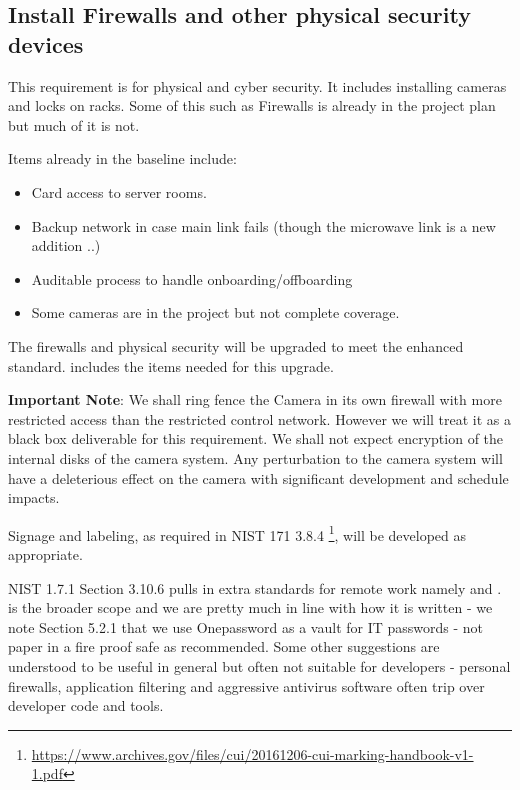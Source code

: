 
\subsection{Install Firewalls and other physical security devices} \label{sec:2firewalls}

This requirement is for physical and cyber security. It includes installing cameras and locks on racks.
Some of this such as Firewalls is already in the project plan but much of it is not.

Items already in the baseline include:
\begin{itemize}
\item Card access to server rooms.
\item Backup network in case main link fails (though the microwave link is a new addition ..)
\item Auditable process to handle onboarding/offboarding
\item Some cameras are in the project but not complete coverage.

\end{itemize}

The firewalls and physical security will be upgraded to meet the enhanced standard.  includes the items needed for this upgrade.

{\bf Important Note}: We shall ring fence the Camera in its own firewall with more restricted access than the restricted control network.
However we will treat it as a black box deliverable for this requirement. We shall not expect encryption of the internal disks of the camera system. Any perturbation to the camera system will have a deleterious effect on the camera with significant development and schedule impacts.

Signage and labeling, as required in NIST 171 3.8.4 \footnote{\url{https://www.archives.gov/files/cui/20161206-cui-marking-handbook-v1-1.pdf}}, will be developed as appropriate.

NIST 1.7.1 Section 3.10.6 pulls in extra standards for remote work namely  and .
 is the broader scope and we are pretty much in line with how it is written - we note Section 5.2.1 that we use Onepassword as a vault for IT passwords - not paper in a fire proof safe as recommended.
Some other suggestions are understood to be useful in general but often not suitable for developers - personal firewalls, application filtering  and aggressive antivirus software often trip over developer code and tools.

